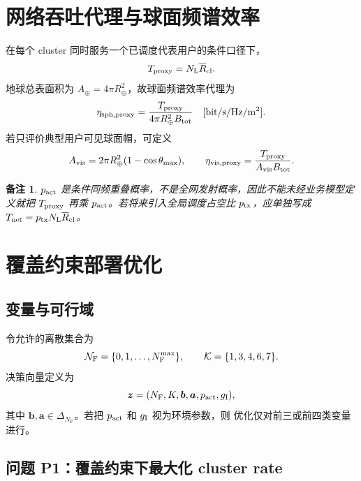\documentclass[UTF8,a4paper,11pt]{ctexart}
\newtheorem{remark}{备注}[section]
\newcommand{\NL}{N_{\mathrm L}}
\newcommand{\NF}{N_{\mathrm F}}
\newcommand{\Rearth}{R_{\oplus}}
\newcommand{\thetam}{\theta_{\max}}
\newcommand{\Btot}{B_{\mathrm{tot}}}
\newcommand{\Rbar}{\overline R}
\newcommand{\bvec}{\bm b}
\newcommand{\avec}{\bm a}
\newcommand{\Simplex}{\Delta}
\begin{document}
\section{网络吞吐代理与球面频谱效率}

在每个 cluster 同时服务一个已调度代表用户的条件口径下，
\begin{equation}
 T_{\rm proxy}
 =
 \NL\Rbar_{\rm cl}.
 \label{eq:network-throughput-proxy}
\end{equation}
地球总表面积为 $A_{\oplus}=4\pi\Rearth^2$，故球面频谱效率代理为
\begin{equation}
 \eta_{\rm sph,proxy}
 =
 \frac{T_{\rm proxy}}{4\pi\Rearth^2\Btot}
 \quad
 [\mathrm{bit/s/Hz/m^2}].
 \label{eq:spherical-efficiency}
\end{equation}
若只评价典型用户可见球面帽，可定义
\begin{equation}
 A_{\rm vis}=2\pi\Rearth^2(1-\cos\thetam),
 \qquad
 \eta_{\rm vis,proxy}
 =
 \frac{T_{\rm proxy}}{A_{\rm vis}\Btot}.
 \label{eq:visible-efficiency}
\end{equation}

\begin{remark}
$p_{\rm act}$ 是条件同频重叠概率，不是全网发射概率，因此不能未经业务模型定义就把
$T_{\rm proxy}$ 再乘 $p_{\rm act}$。若将来引入全局调度占空比 $p_{\rm tx}$，应单独写成
$T_{\rm net}=p_{\rm tx}\NL\Rbar_{\rm cl}$。
\end{remark}

\section{覆盖约束部署优化}

\subsection{变量与可行域}

令允许的离散集合为
\begin{equation}
 \mathcal N_{\rm F}=\{0,1,\ldots,N_{\rm F}^{\max}\},
 \qquad
 \mathcal K=\{1,3,4,6,7\}.
 \label{eq:discrete-domains}
\end{equation}
决策向量定义为
\begin{equation}
 \bm z=(\NF,K,\bvec,\avec,p_{\rm act},g_{\rm I}),
 \label{eq:decision-vector}
\end{equation}
其中 $\bvec,\avec\in\Simplex_{\NF}$。若把 $p_{\rm act}$ 和 $g_{\rm I}$ 视为环境参数，则
优化仅对前三或前四类变量进行。

\subsection{问题 P1：覆盖约束下最大化 cluster rate}
\end{document}
